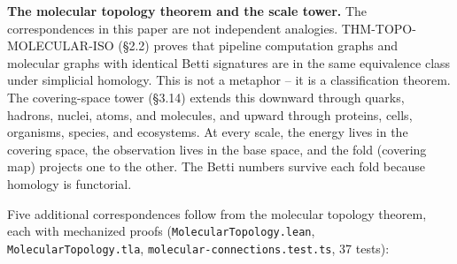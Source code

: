 \documentclass[
  11pt,
]{article}
\begin{document}
\textbf{The molecular topology theorem and the scale tower.} The
correspondences in this paper are not independent analogies.
THM-TOPO-MOLECULAR-ISO (§2.2) proves that pipeline computation graphs
and molecular graphs with identical Betti signatures are in the same
equivalence class under simplicial homology. This is not a metaphor --
it is a classification theorem. The covering-space tower (§3.14) extends
this downward through quarks, hadrons, nuclei, atoms, and molecules, and
upward through proteins, cells, organisms, species, and ecosystems. At
every scale, the energy lives in the covering space, the observation
lives in the base space, and the fold (covering map) projects one to the
other. The Betti numbers survive each fold because homology is
functorial.

Five additional correspondences follow from the molecular topology
theorem, each with mechanized proofs (\texttt{MolecularTopology.lean},
\texttt{MolecularTopology.tla}, \texttt{molecular-connections.test.ts},
37 tests):
\end{document}
